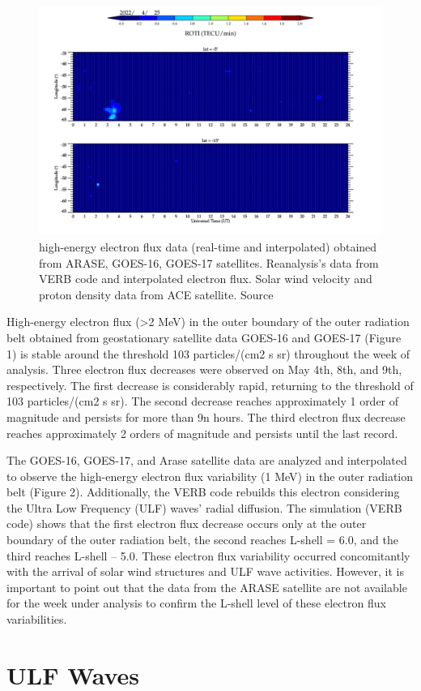 \documentclass[11pt, oneside]{article}
\begin{document}
                     \begin{figure}[H]
    
                        \centering
   
                             \includegraphics[width=14cm]{./figures//figureRadBelts_1.png}

                             \caption{ high-energy electron flux data (real-time and interpolated) obtained from ARASE, GOES-16, GOES-17 satellites. Reanalysis’s data from VERB code and interpolated electron flux. Solar wind velocity and proton density data from ACE satellite. Source}
                        \end{figure}

                     High-energy electron flux (>2 MeV) in the outer boundary of the outer radiation belt obtained from geostationary satellite data GOES-16 and GOES-17 (Figure 1) is stable around the threshold 103 particles/(cm2 s sr) throughout the week of analysis. Three electron flux decreases were observed on May 4th, 8th, and 9th, respectively. The first decrease is considerably rapid, returning to the threshold of 103 particles/(cm2 s sr). The second decrease reaches approximately 1 order of magnitude and persists for more than 9n hours. The third electron flux decrease reaches approximately 2 orders of magnitude and persists until the last record.    

The GOES-16, GOES-17, and Arase satellite data are analyzed and interpolated to observe the high-energy electron flux variability (1 MeV) in the outer radiation belt (Figure 2). Additionally, the VERB code rebuilds this electron considering the Ultra Low Frequency (ULF) waves' radial diffusion. The simulation (VERB code) shows that the first electron flux decrease occurs only at the outer boundary of the outer radiation belt, the second reaches L-shell = 6.0, and the third reaches L-shell – 5.0. These electron flux variability occurred concomitantly with the arrival of solar wind structures and ULF wave activities. However, it is important to point out that the data from the ARASE satellite are not available for the week under analysis to confirm the L-shell level of these electron flux variabilities.\section{ULF Waves} 
\end{document}
